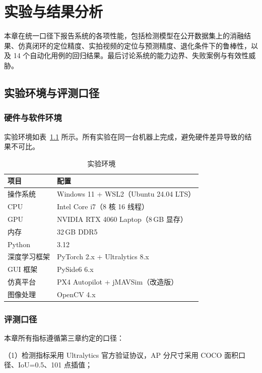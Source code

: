 \chapter{实验与结果分析}

本章在统一口径下报告系统的各项性能，包括检测模型在公开数据集上的消融结果、仿真闭环的定位精度、实拍视频的定位与预测精度、退化条件下的鲁棒性，以及 14 个自动化用例的回归结果。最后讨论系统的能力边界、失败案例与有效性威胁。

\section{实验环境与评测口径}

\subsection{硬件与软件环境}

实验环境如表~\ref{tab:exp_env} 所示。所有实验在同一台机器上完成，避免硬件差异导致的结果不可比。

\begin{table}[htbp]
\centering
\caption{实验环境}
\label{tab:exp_env}
\small
\begin{tabular}{ll}
\toprule
\textbf{项目} & \textbf{配置} \\
\midrule
操作系统 & Windows 11 + WSL2（Ubuntu 24.04 LTS） \\
CPU & Intel Core i7（8 核 16 线程） \\
GPU & NVIDIA RTX 4060 Laptop（8\,GB 显存） \\
内存 & 32\,GB DDR5 \\
Python & 3.12 \\
深度学习框架 & PyTorch 2.x + Ultralytics 8.x \\
GUI 框架 & PySide6 6.x \\
仿真平台 & PX4 Autopilot + jMAVSim（改造版） \\
图像处理 & OpenCV 4.x \\
\bottomrule
\end{tabular}
\end{table}

\subsection{评测口径}

本章所有指标遵循第三章约定的口径：

（1）检测指标采用 Ultralytics 官方验证协议，AP 分尺寸采用 COCO 面积口径、IoU=0.5、101 点插值；

